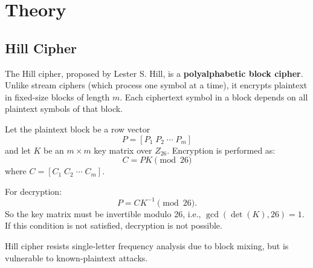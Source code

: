 
\section{Theory}
\subsection*{Hill Cipher}
The Hill cipher, proposed by Lester S. Hill, is a \textbf{polyalphabetic block cipher}.
Unlike stream ciphers (which process one symbol at a time), it encrypts plaintext in fixed-size blocks of length \(m\). Each ciphertext symbol in a block depends on all plaintext symbols of that block.

Let the plaintext block be a row vector
\[
P = [P_1\; P_2\; \cdots\; P_m]
\]
and let \(K\) be an \(m \times m\) key matrix over \(Z_{26}\).
Encryption is performed as:
\[
C = P K \pmod{26}
\]
where \(C = [C_1\; C_2\; \cdots\; C_m]\).

For decryption:
\[
P = C K^{-1} \pmod{26}.
\]
So the key matrix must be invertible modulo 26, i.e., \(\gcd(\det(K), 26)=1\).
If this condition is not satisfied, decryption is not possible.

Hill cipher resists single-letter frequency analysis due to block mixing, but is vulnerable to known-plaintext attacks.

